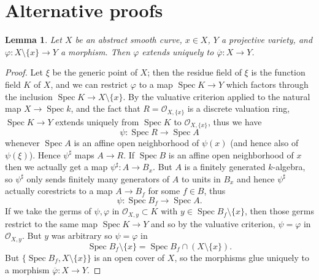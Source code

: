\documentclass[reqno,12pt,letterpaper]{amsart}
\DeclareMathOperator{\Spec}{Spec}
\newcommand{\Olo}{\mathscr O}
\newtheorem{lemma}[theorem]{Lemma}
\theoremstyle{definition}
\begin{document}
\section{Alternative proofs}
\begin{lemma}
Let $X$ be an abstract smooth curve, $x \in X$, $Y$ a projective variety, and $\varphi: X \setminus \{x\} \to Y$ a morphism.
Then $\varphi$ extends uniquely to $\overline \varphi: X \to Y$.
\end{lemma}
\begin{proof}
Let $\xi$ be the generic point of $X$; then the residue field of $\xi$ is the function field $K$ of $X$, and we can restrict $\varphi$ to a map $\Spec K \to Y$
which factors through the inclusion $\Spec K \to X \setminus \{x\}$.
By the valuative criterion applied to the natural map $X \to \Spec k$, and the fact that $R = \Olo_{X, \{x\}}$ is a discrete valuation ring, $\Spec K \to Y$ extends uniquely from $\Spec K$ to $\Olo_{X,\{x\}}$, thus we have
$$\psi: \Spec R \to \Spec A$$
whenever $\Spec A$ is an affine open neighborhood of $\psi(x)$ (and hence also of $\psi(\xi)$). Hence $\psi^\sharp$ maps $A \to R$.
If $\Spec B$ is an affine open neighborhood of $x$ then we actually get a map $\psi^\sharp: A \to B_x$.
But $A$ is a finitely generated $k$-algebra, so $\psi^\sharp$ only sends finitely many generators of $A$ to units in $B_x$ and hence $\psi^\sharp$ actually corestricts to a map $A \to B_f$ for some $f \in B$, thus
$$\psi: \Spec B_f \to \Spec A.$$
If we take the germs of $\psi,\varphi$ in $\Olo_{X, y} \subset K$ with $y \in \Spec B_f\setminus \{x\}$, then those germs restrict to the same map $\Spec K \to Y$ and so by the valuative criterion, $\psi = \varphi$ in $\Olo_{X, y}$.
But $y$ was arbitrary so $\psi = \varphi$ in
$$\Spec B_f \setminus\{x\} = \Spec B_f \cap (X \setminus \{x\}).$$
But $\{\Spec B_f, X \setminus \{x\}\}$ is an open cover of $X$, so the morphisms glue uniquely to a morphism $\overline \varphi: X \to Y$.
\end{proof}




\printbibliography
\end{document}
